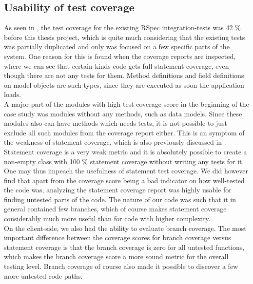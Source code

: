 
\subsection{Usability of test coverage}

As seen in , the test coverage for the
existing RSpec integration-tests was 42 \% before this thesis project,
which is quite much considering that the existing tests was partially
duplicated and only was focused on a few specific parts of the system.
One reason for this is found when the coverage reports are inspected,
where we can see that certain kinds code gets full statement coverage,
even though there are not any tests for them. Method definitions and
field definitions on model objects are such types, since they are
executed as soon the application loads.\\

A major part of the modules with high test coverage score in the
beginning of the case study was modules without any methods, such as
data models. Since these modules also can have methods which needs
tests, it is not possible to just exclude all such modules from the
coverage report either. This is an symptom of the weakness of statement
coverage, which is also previously discussed in
. Statement coverage is a very weak
metric and it is absolutely possible to create a non-empty class with
100 \% statement coverage without writing any tests for it.\\

One may thus impeach the usefulness of statement test coverage. We did
however find that apart from the coverage score being a bad indicator on
how well-tested the code was, analyzing the statement coverage report
was highly usable for finding untested parts of the code. The nature of
our code was such that it in general contained few branches, which of
course makes statement coverage considerably much more useful than for
code with higher complexity.\\

On the client-side, we also had the ability to evaluate branch coverage.
The most important difference between the coverage scores for branch
coverage versus statement coverage is that the branch coverage is zero
for all untested functions, which makes the branch coverage score a more
sound metric for the overall testing level. Branch coverage of course
also made it possible to discover a few more untested code paths.\\



